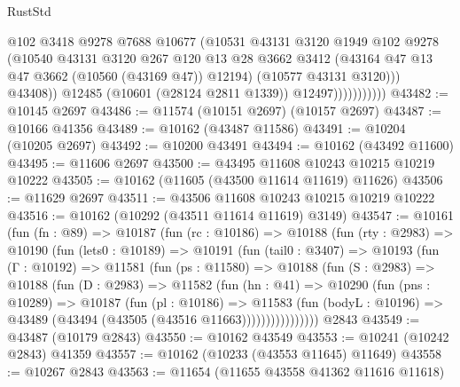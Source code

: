 \begin{lexlean}{RustStd}
\begin{coremodule}
                              @102
                              @3418
                              @9278
                              @7688
                              @10677
                              (@10531
                                @43131
                                @3120
                                @1949
                                @102
                                @9278
                                (@10540
                                  @43131
                                  @3120
                                  @267
                                  @120
                                  @13
                                  @28
                                  @3662
                                  @3412
                                  (@43164 @47 @13 @47 @3662 (@10560 (@43169 @47)) @12194)
                                  (@10577 @43131 @3120)))
                              @43408))
                          @12485
                          (@10601 (@28124 @2811 @1339))
                          @12497)))))))))))
@43482 := @10145 @2697
@43486 := @11574 (@10151 @2697) (@10157 @2697)
@43487 := @10166 @41356
@43489 := @10162 (@43487 @11586)
@43491 := @10204 (@10205 @2697)
@43492 := @10200 @43491
@43494 := @10162 (@43492 @11600)
@43495 := @11606 @2697
@43500 := @43495 @11608 @10243 @10215 @10219 @10222
@43505 := @10162 (@11605 (@43500 @11614 @11619) @11626)
@43506 := @11629 @2697
@43511 := @43506 @11608 @10243 @10215 @10219 @10222
@43516 := @10162 (@10292 (@43511 @11614 @11619) @3149)
@43547 := @10161
    (fun (fn : @89) =>
    @10187
      (fun (rc : @10186) =>
      @10188
        (fun (rty : @2983) =>
        @10190
          (fun (lets0 : @10189) =>
          @10191
            (fun (tail0 : @3407) =>
            @10193
              (fun (Γ : @10192) =>
              @11581
                (fun (ps : @11580) =>
                @10188
                  (fun (S : @2983) =>
                  @10188
                    (fun (D : @2983) =>
                    @11582
                      (fun (hn : @41) =>
                      @10290
                        (fun (pns : @10289) =>
                        @10187
                          (fun (pl : @10186) =>
                          @11583
                            (fun (bodyL : @10196) =>
                            @43489 (@43494 (@43505 (@43516 @11663))))))))))))))))
    @2843
@43549 := @43487 (@10179 @2843)
@43550 := @10162 @43549
@43553 := @10241 (@10242 @2843) @41359
@43557 := @10162 (@10233 (@43553 @11645) @11649)
@43558 := @10267 @2843
@43563 := @11654 (@11655 @43558 @41362 @11616 @11618)

\end{coremodule}
\end{lexlean}
